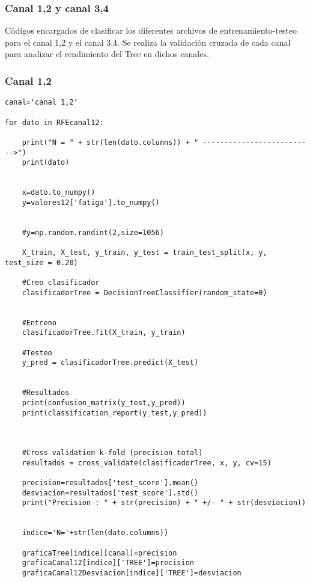 \subsubsection{Canal 1,2 y canal 3,4}
Códigos encargados de clasificar los diferentes archivos de entrenamiento-testeo para el canal 1,2 y el canal 3,4.  Se realiza la validación cruzada de cada canal para analizar el rendimiento del Tree en dichos canales.
    \subsubsection{Canal 1,2}
\begin{lstlisting}
canal='canal 1,2'

for dato in RFEcanal12:
    
    print("N = " + str(len(dato.columns)) + " -------------------------->")
    print(dato)
    
    
    x=dato.to_numpy()
    y=valores12['fatiga'].to_numpy()

    
    #y=np.random.randint(2,size=1056)
    
    X_train, X_test, y_train, y_test = train_test_split(x, y, test_size = 0.20)
    
    #Creo clasificador
    clasificadorTree = DecisionTreeClassifier(random_state=0)


    #Entreno
    clasificadorTree.fit(X_train, y_train)

    #Testeo 
    y_pred = clasificadorTree.predict(X_test)


    #Resultados
    print(confusion_matrix(y_test,y_pred))
    print(classification_report(y_test,y_pred))



    #Cross validation k-fold (precision total)
    resultados = cross_validate(clasificadorTree, x, y, cv=15)
    
    precision=resultados['test_score'].mean()
    desviacion=resultados['test_score'].std()
    print("Precision : " + str(precision) + " +/- " + str(desviacion))
    
    
    indice='N='+str(len(dato.columns))
    
    graficaTree[indice][canal]=precision
    graficaCanal12[indice]['TREE']=precision
    graficaCanal12Desviacion[indice]['TREE']=desviacion
\end{lstlisting}
